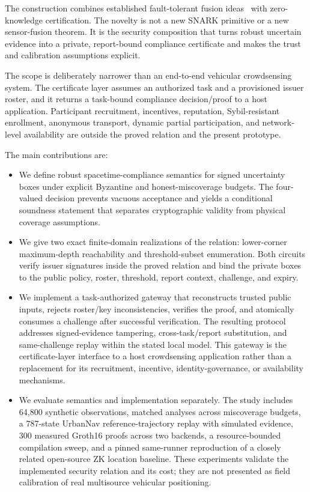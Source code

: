 \documentclass[preprint,review,12pt]{elsarticle}
\begin{document}
The construction combines established fault-tolerant fusion ideas~\cite{Marzullo1990,BFTPoLoc,PG,CRSF} with zero-knowledge certification. The novelty is not a new SNARK primitive or a new sensor-fusion theorem. It is the security composition that turns robust uncertain evidence into a private, report-bound compliance certificate and makes the trust and calibration assumptions explicit.

The scope is deliberately narrower than an end-to-end vehicular crowdsensing system. The certificate layer assumes an authorized task and a provisioned issuer roster, and it returns a task-bound compliance decision/proof to a host application. Participant recruitment, incentives, reputation, Sybil-resistant enrollment, anonymous transport, dynamic partial participation, and network-level availability are outside the proved relation and the present prototype.

The main contributions are:
\begin{itemize}
 \item We define robust spacetime-compliance semantics for signed uncertainty boxes under explicit Byzantine and honest-miscoverage budgets. The four-valued decision prevents vacuous acceptance and yields a conditional soundness statement that separates cryptographic validity from physical coverage assumptions.
 \item We give two exact finite-domain realizations of the relation: lower-corner maximum-depth reachability and threshold-subset enumeration. Both circuits verify issuer signatures inside the proved relation and bind the private boxes to the public policy, roster, threshold, report context, challenge, and expiry.
 \item We implement a task-authorized gateway that reconstructs trusted public inputs, rejects roster/key inconsistencies, verifies the proof, and atomically consumes a challenge after successful verification. The resulting protocol addresses signed-evidence tampering, cross-task/report substitution, and same-challenge replay within the stated local model. This gateway is the certificate-layer interface to a host crowdsensing application rather than a replacement for its recruitment, incentive, identity-governance, or availability mechanisms.
 \item We evaluate semantics and implementation separately. The study includes 64,800 synthetic observations, matched analyses across miscoverage budgets, a 787-state UrbanNav reference-trajectory replay with simulated evidence, 300 measured Groth16 proofs across two backends, a resource-bounded compilation sweep, and a pinned same-runner reproduction of a closely related open-source ZK location baseline. These experiments validate the implemented security relation and its cost; they are not presented as field calibration of real multisource vehicular positioning.
\end{itemize}
\end{document}
